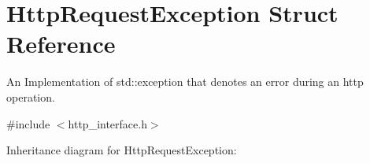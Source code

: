 \hypertarget{structHttpRequestException}{}\section{Http\+Request\+Exception Struct Reference}
\label{structHttpRequestException}


An Implementation of std\+::exception that denotes an error during an http operation.  




{\ttfamily \#include $<$http\+\_\+interface.\+h$>$}



Inheritance diagram for Http\+Request\+Exception\+:
